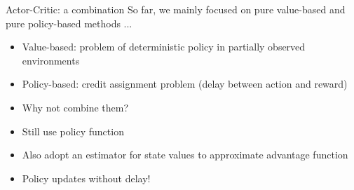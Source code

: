 \begin{frame}{Actor-Critic: a combination}
    So far, we mainly focused on pure value-based and pure policy-based methods ... \vspace{0.3cm}
    \begin{itemize}
        \item Value-based: problem of deterministic policy in partially observed environments\vspace{0.3cm}
        \item Policy-based: credit assignment problem (delay between action and reward)\vspace{0.3cm}
        \item Why not combine them?\vspace{0.3cm}
        \item Still use policy function\vspace{0.3cm}
        \item Also adopt an estimator for state values to approximate advantage function\vspace{0.3cm}
        \item Policy updates without delay!
    \end{itemize}
\end{frame}
\iffalse
\begin{frame}{Actor-Critic: algorithm}
    \vspace{0.2cm}
    Now there are two function to learn: policy function $\pi_{\theta}$ is known as actor and value estimator $\hat{V_{\varphi}}$ is known as critic, hence the model named \textbf{Actor-Critic}.
    \begin{center}\texttt{[image: AC1]}\end{center}
\end{frame}
\fi

